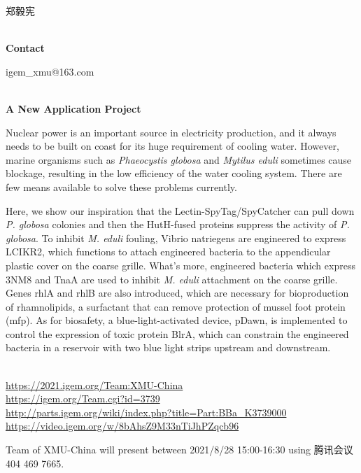   郑毅宪


\textbf{\\Contact}

  igem\_xmu@163.com


\textbf{\\A New Application Project\\}\begin{spacing}{1.5}

Nuclear power is an important source in electricity production, and it always needs to be built on coast for its huge requirement of cooling water. However, marine organisms such as \textit{Phaeocystis globosa} and \textit{Mytilus eduli} sometimes cause blockage, resulting in the low efficiency of the water cooling system. There are few means available to solve these problems currently.

Here, we show our inspiration that the Lectin-SpyTag/SpyCatcher can pull down \textit{P. globosa} colonies and then the HutH-fused proteins suppress the activity of \textit{P. globosa}. To inhibit \textit{M. eduli} fouling, Vibrio natriegens are engineered to express LCIKR2, which functions to attach engineered bacteria to the appendicular plastic cover on the coarse grille. What’s more, engineered bacteria which express 3NM8 and TnaA are used to inhibit \textit{M. eduli} attachment on the coarse grille. Genes rhlA and rhlB are also introduced, which are necessary for bioproduction of rhamnolipids, a surfactant that can remove protection of mussel foot protein (mfp). As for biosafety, a blue-light-activated device, pDawn, is implemented to control the expression of toxic protein BlrA, which can constrain the engineered bacteria in a reservoir with two blue light strips upstream and downstream.\end{spacing}
\\

\url{https://2021.igem.org/Team:XMU-China }\\
\url{https://igem.org/Team.cgi?id=3739 }\\
\url{http://parts.igem.org/wiki/index.php?title=Part:BBa_K3739000 }\\
\url{https://video.igem.org/w/8bAhsZ9M33nTiJhPZqcb96 }\\

\vfill{}









Team of XMU-China will present between       2021/8/28 15:00-16:30  using 腾讯会议 404 469 7665.
\newpage


